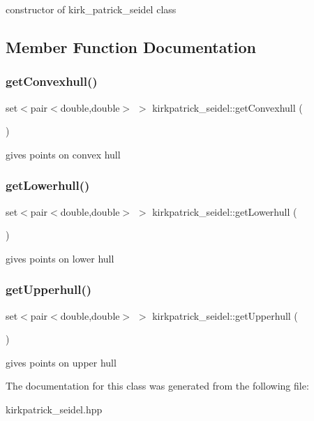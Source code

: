 constructor of kirk\+\_\+patrick\+\_\+seidel class 

\subsection{Member Function Documentation}
\mbox{\label{classkirkpatrick__seidel_ad1f7b4aac8829f16ba46ef9d54604f5e}} 
\subsubsection{\texorpdfstring{get\+Convexhull()}{getConvexhull()}}
{\footnotesize\ttfamily set$<$pair$<$double,double$>$ $>$ kirkpatrick\+\_\+seidel\+::get\+Convexhull (\begin{DoxyParamCaption}{ }\end{DoxyParamCaption})\hspace{0.3cm}{\ttfamily [inline]}}

gives points on convex hull \mbox{\label{classkirkpatrick__seidel_a689118150a83f5ec577d51df646ff13c}} 
\subsubsection{\texorpdfstring{get\+Lowerhull()}{getLowerhull()}}
{\footnotesize\ttfamily set$<$pair$<$double,double$>$ $>$ kirkpatrick\+\_\+seidel\+::get\+Lowerhull (\begin{DoxyParamCaption}{ }\end{DoxyParamCaption})\hspace{0.3cm}{\ttfamily [inline]}}

gives points on lower hull \mbox{\label{classkirkpatrick__seidel_a2780be982683d28841042553a7f8d405}} 
\subsubsection{\texorpdfstring{get\+Upperhull()}{getUpperhull()}}
{\footnotesize\ttfamily set$<$pair$<$double,double$>$ $>$ kirkpatrick\+\_\+seidel\+::get\+Upperhull (\begin{DoxyParamCaption}{ }\end{DoxyParamCaption})\hspace{0.3cm}{\ttfamily [inline]}}

gives points on upper hull 

The documentation for this class was generated from the following file\+:\begin{DoxyCompactItemize}
\item 
kirkpatrick\+\_\+seidel.\+hpp\end{DoxyCompactItemize}
